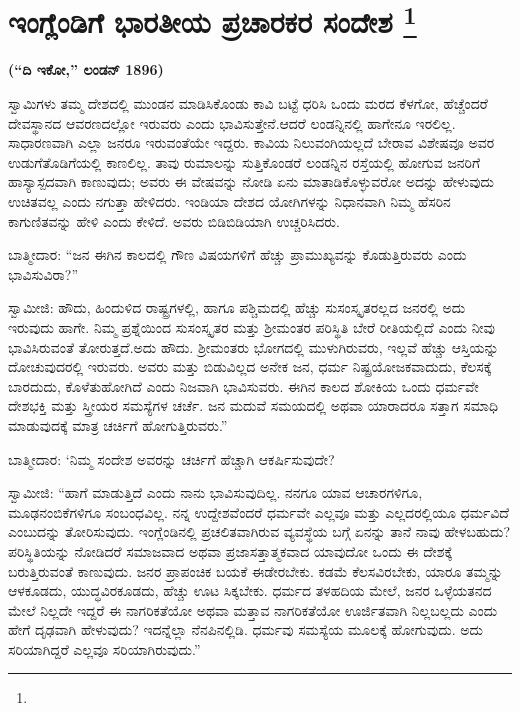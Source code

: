 
\chapter[ಇಂಗ್ಲೆಂಡಿಗೆ ಭಾರತೀಯ ಪ್ರಚಾರಕರ ಸಂದೇಶ ]{ಇಂಗ್ಲೆಂಡಿಗೆ ಭಾರತೀಯ ಪ್ರಚಾರಕರ ಸಂದೇಶ \protect\footnote{}}

\centerline{\textbf{(“ದಿ ಇಕೋ,” ಲಂಡನ್​ 1896)}}

ಸ್ವಾಮಿಗಳು ತಮ್ಮ ದೇಶದಲ್ಲಿ ಮುಂಡನ ಮಾಡಿಸಿಕೊಂಡು ಕಾವಿ ಬಟ್ಟೆ ಧರಿಸಿ ಒಂದು ಮರದ ಕೆಳಗೋ, ಹೆಚ್ಚೆಂದರೆ ದೇವಸ್ಥಾನದ ಆವರಣದಲ್ಲೋ ಇರುವರು ಎಂದು ಭಾವಿಸುತ್ತೇನೆ.\break ಆದರೆ ಲಂಡನ್ನಿನಲ್ಲಿ ಹಾಗೇನೂ ಇರಲಿಲ್ಲ. ಸಾಧಾರಣವಾಗಿ ಎಲ್ಲಾ ಜನರೂ ಇರುವಂತೆಯೇ ಇದ್ದರು. ಕಾವಿಯ ನಿಲುವಂಗಿಯಲ್ಲದೆ ಬೇರಾವ ವಿಶೇಷವೂ ಅವರ ಉಡುಗೆತೊಡಿಗೆಯಲ್ಲಿ ಕಾಣಲಿಲ್ಲ. ತಾವು ರುಮಾಲನ್ನು ಸುತ್ತಿಕೊಂಡರೆ ಲಂಡನ್ನಿನ ರಸ್ತೆಯಲ್ಲಿ ಹೋಗುವ ಜನರಿಗೆ ಹಾಸ್ಯಾಸ್ಪದವಾಗಿ ಕಾಣುವುದು; ಅವರು ಈ ವೇಷವನ್ನು ನೋಡಿ ಏನು ಮಾತಾಡಿಕೊಳ್ಳುವರೋ ಅದನ್ನು ಹೇಳುವುದು ಉಚಿತವಲ್ಲ ಎಂದು ನಗುತ್ತಾ ಹೇಳಿದರು. ಇಂಡಿಯಾ ದೇಶದ ಯೋಗಿಗಳನ್ನು ನಿಧಾನವಾಗಿ ನಿಮ್ಮ ಹೆಸರಿನ ಕಾಗುಣಿತವನ್ನು ಹೇಳಿ ಎಂದು ಕೇಳಿದೆ. ಅವರು ಬಿಡಿಬಿಡಿಯಾಗಿ ಉಚ್ಚರಿಸಿದರು.

\vskip 5pt

ಬಾತ್ಮೀದಾರ: “ಜನ ಈಗಿನ ಕಾಲದಲ್ಲಿ ಗೌಣ ವಿಷಯಗಳಿಗೆ ಹೆಚ್ಚು ಪ್ರಾಮುಖ್ಯವನ್ನು ಕೊಡುತ್ತಿರುವರು ಎಂದು ಭಾವಿಸುವಿರಾ?”

\vskip 5pt

ಸ್ವಾಮೀಜಿ: ಹೌದು, ಹಿಂದುಳಿದ ರಾಷ್ಟ್ರಗಳಲ್ಲಿ, ಹಾಗೂ ಪಶ್ಚಿಮದಲ್ಲಿ ಹೆಚ್ಚು ಸುಸಂಸ್ಕೃತರಲ್ಲದ ಜನರಲ್ಲಿ ಅದು ಇರುವುದು ಹಾಗೇ. ನಿಮ್ಮ ಪ್ರಶ್ನೆಯಿಂದ ಸುಸಂಸ್ಕೃತರ ಮತ್ತು ಶ‍್ರೀಮಂತರ ಪರಿಸ್ಥಿತಿ ಬೇರೆ ರೀತಿಯಲ್ಲಿದೆ ಎಂದು ನೀವು ಭಾವಿಸಿರುವಂತೆ ತೋರುತ್ತದೆ.\break ಅದು ಹೌದು. ಶ‍್ರೀಮಂತರು ಭೋಗದಲ್ಲಿ ಮುಳುಗಿರುವರು, ಇಲ್ಲವೆ ಹೆಚ್ಚು ಆಸ್ತಿಯನ್ನು ದೋಚುವುದರಲ್ಲಿ ಇರುವರು. ಅವರು ಮತ್ತು ಬಿಡುವಿಲ್ಲದ ಅನೇಕ ಜನ, ಧರ್ಮ ನಿಷ್ಪ್ರಯೋಜಕವಾದುದು, ಕೆಲಸಕ್ಕೆ ಬಾರದುದು, ಕೊಳೆತುಹೋಗಿದೆ ಎಂದು ನಿಜವಾಗಿ ಭಾವಿಸುವರು. ಈಗಿನ ಕಾಲದ ಶೋಕಿಯ ಒಂದು ಧರ್ಮವೇ ದೇಶಭಕ್ತಿ ಮತ್ತು ಸ್ತ್ರೀಯರ ಸಮಸ್ಯೆಗಳ ಚರ್ಚೆ. ಜನ ಮದುವೆ ಸಮಯದಲ್ಲಿ ಅಥವಾ ಯಾರಾದರೂ ಸತ್ತಾಗ ಸಮಾಧಿ ಮಾಡುವುದಕ್ಕೆ ಮಾತ್ರ ಚರ್ಚಿಗೆ ಹೋಗುತ್ತಿರುವರು.”

\vskip 3pt

ಬಾತ್ಮೀದಾರ: ‘ನಿಮ್ಮ ಸಂದೇಶ ಅವರನ್ನು ಚರ್ಚಿಗೆ ಹೆಚ್ಚಾಗಿ ಆಕರ್ಷಿಸುವುದೇ?

\vskip 2pt

ಸ್ವಾಮೀಜಿ: “ಹಾಗೆ ಮಾಡುತ್ತಿದೆ ಎಂದು ನಾನು ಭಾವಿಸುವುದಿಲ್ಲ. ನನಗೂ ಯಾವ ಆಚಾರಗಳಿಗೂ, ಮೂಢನಂಬಿಕೆಗಳಿಗೂ ಸಂಬಂಧವಿಲ್ಲ. ನನ್ನ ಉದ್ದೇಶವೆಂದರೆ ಧರ್ಮವೇ ಎಲ್ಲವೂ ಮತ್ತು ಎಲ್ಲದರಲ್ಲಿಯೂ ಧರ್ಮವಿದೆ ಎಂಬುದನ್ನು ತೋರಿಸುವುದು. ಇಂಗ್ಲೆಂಡಿನಲ್ಲಿ ಪ್ರಚಲಿತವಾಗಿರುವ ವ್ಯವಸ್ಥೆಯ ಬಗ್ಗೆ ಏನನ್ನು ತಾನೆ ನಾವು ಹೇಳಬಹುದು? ಪರಿಸ್ಥಿತಿಯನ್ನು ನೋಡಿದರೆ ಸಮಾಜವಾದ ಅಥವಾ ಪ್ರಜಾಸತ್ತಾತ್ಮಕವಾದ ಯಾವುದೋ ಒಂದು ಈ ದೇಶಕ್ಕೆ ಬರುತ್ತಿರುವಂತೆ ಕಾಣುವುದು. ಜನರ ಪ್ರಾಪಂಚಿಕ ಬಯಕೆ ಈಡೇರಬೇಕು. ಕಡಮೆ ಕೆಲಸವಿರಬೇಕು, ಯಾರೂ ತಮ್ಮನ್ನು ಆಳಕೂಡದು, ಯುದ್ಧವಿರಕೂಡದು, ಹೆಚ್ಚು ಊಟ ಸಿಕ್ಕಬೇಕು. ಧರ್ಮದ ತಳಹದಿಯ ಮೇಲೆ, ಜನರ ಒಳ್ಳೆಯತನದ ಮೇಲೆ ನಿಲ್ಲದೇ ಇದ್ದರೆ ಈ ನಾಗರಿಕತೆಯೋ ಅಥವಾ ಮತ್ತಾವ ನಾಗರಿಕತೆಯೋ ಊರ್ಜಿತವಾಗಿ ನಿಲ್ಲಬಲ್ಲದು ಎಂದು ಹೇಗೆ ದೃಢವಾಗಿ ಹೇಳುವುದು? ಇದನ್ನೆಲ್ಲಾ ನೆನಪಿನಲ್ಲಿಡಿ. ಧರ್ಮವು ಸಮಸ್ಯೆಯ ಮೂಲಕ್ಕೆ ಹೋಗುವುದು. ಅದು ಸರಿಯಾಗಿದ್ದರೆ ಎಲ್ಲವೂ ಸರಿಯಾಗಿರುವುದು.”


